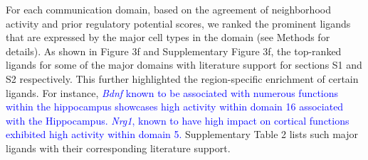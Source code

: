 

For each communication domain, based on the agreement of neighborhood activity and prior regulatory potential scores, we ranked the prominent ligands that are expressed by the major cell types in the domain (see Methods for details). As shown in Figure 3f and Supplementary Figure 3f, the top-ranked ligands for some of the major domains with literature support for sections S1 and S2 respectively. This further highlighted the region-specific enrichment of certain ligands. For instance, \textcolor{blue}{\textit{Bdnf} known to be associated with numerous functions within the hippocampus \citep{Heldt2007} showcases high activity within domain 16 associated with the Hippocampus. \textit{Nrg1}, known to have high impact on cortical functions \citep{AGARWAL20141130} exhibited high activity within domain 5.} Supplementary Table 2 lists such major ligands with their corresponding literature support.

